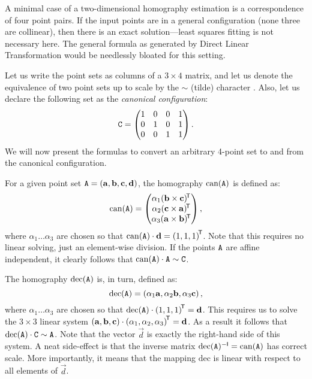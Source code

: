 A minimal case of a two-dimensional homography estimation is a correspondence of four point pairs.
If the input points are in a general configuration (none three are collinear), then there is an exact solution---least squares fitting is not necessary here.
The general formula as generated by Direct Linear Transformation would be needlessly bloated for this setting.


Let us write the point sets as columns of a $3 \times 4$ matrix, and let us denote the equivalence of two point sets up to scale by the $\sim$ (tilde) character .
Also, let us declare the following set as the \textit{canonical configuration}:
$$\mathtt{C} = \begin{pmatrix}
 1 & 0 & 0 & 1 \\
 0 & 1 & 0 & 1 \\
 0 & 0 & 1 & 1
 \end{pmatrix}.$$
We will now present the formulas to convert an arbitrary 4-point set to and from the canonical configuration.

For a given point set $\mathtt{A} = \left( \mathbf{a}, \mathbf{b}, \mathbf{c}, \mathbf{d} \right)$, the homography $\mathrm{can}(\mathtt{A})$ is defined as:
$$\mathrm{can}(\mathtt{A}) = \begin{pmatrix}
 \alpha_1 (\mathbf{b} \times \mathbf{c}) ^{\!\mathsf{T}} \\
 \alpha_2 (\mathbf{c} \times \mathbf{a}) ^{\!\mathsf{T}} \\
 \alpha_3 (\mathbf{a} \times \mathbf{b}) ^{\!\mathsf{T}} \\
 \end{pmatrix},
$$
where $\alpha_1 \dots \alpha_3$ are chosen so that $\mathrm{can}(\mathtt{A}) \cdot \mathbf{d} = \left( 1, 1, 1 \right)^{\!\mathsf{T}}$.
Note that this requires no linear solving, just an element-wise division.
If the points $\mathtt{A}$ are affine independent, it clearly follows that $\mathrm{can}(\mathtt{A}) \cdot \mathtt{A} \sim \mathtt{C}$.

The homography $\mathrm{dec}(\mathtt{A})$ is, in turn, defined as:
$$\mathrm{dec}(\mathtt{A}) = \left( \alpha_1 \mathbf{a}, \alpha_2 \mathbf{b}, \alpha_3 \mathbf{c} \right),$$
where $\alpha_1 \dots \alpha_3$ are chosen so that $\mathrm{dec}(\mathtt{A}) \cdot \left( 1, 1, 1 \right)^{\!\mathsf{T}} = \mathbf{d}$.
This requires us to solve the $3 \times 3$ linear system $\left(\mathbf{a}, \mathbf{b}, \mathbf{c} \right) \cdot \left(\alpha_1, \alpha_2, \alpha_3 \right) ^{\!\mathsf{T}} = \mathbf{d}$.
As a result it follows that $\mathrm{dec}(\mathtt{A}) \cdot \mathtt{C} \sim \mathtt{A}$.
Note that the vector $\vec d$ is exactly the right-hand side of this system.
A neat side-effect is that the inverse matrix $\mathrm{dec}(\mathtt{A}) ^{-\mathsf{I}} = \mathrm{can}(\mathtt{A})$ has correct scale. 
More importantly, it means that the mapping $\mathrm{dec}$ is linear with respect to all elements of $\vec d$.

